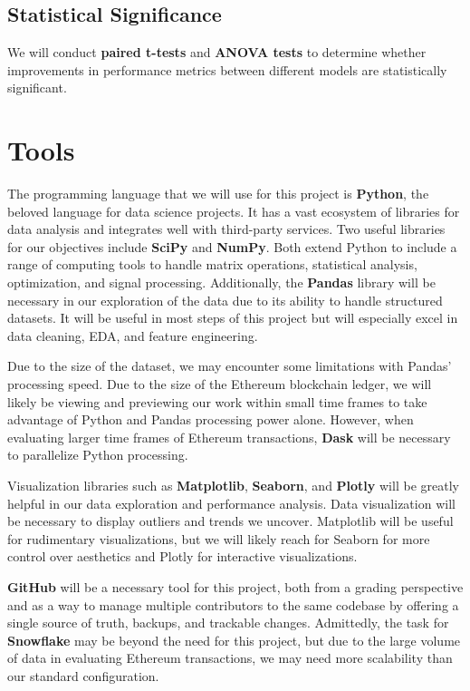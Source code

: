 \documentclass[sigconf]{acmart}
\begin{document}
\subsection{Statistical Significance}
We will conduct \textbf{paired t-tests} and \textbf{ANOVA tests} to determine whether improvements in performance metrics between different models are statistically significant.

\section{Tools}

The programming language that we will use for this project is \textbf{Python}, the beloved language for data science projects. It has a vast ecosystem of libraries for data analysis and integrates well with third-party services. Two useful libraries for our objectives include \textbf{SciPy} and \textbf{NumPy}. Both extend Python to include a range of computing tools to handle matrix operations, statistical analysis, optimization, and signal processing. Additionally, the \textbf{Pandas} library will be necessary in our exploration of the data due to its ability to handle structured datasets. It will be useful in most steps of this project but will especially excel in data cleaning, EDA, and feature engineering.

Due to the size of the dataset, we may encounter some limitations with Pandas’ processing speed. Due to the size of the Ethereum blockchain ledger, we will likely be viewing and previewing our work within small time frames to take advantage of Python and Pandas processing power alone. However, when evaluating larger time frames of Ethereum transactions, \textbf{Dask} will be necessary to parallelize Python processing.

Visualization libraries such as \textbf{Matplotlib}, \textbf{Seaborn}, and \textbf{Plotly} will be greatly helpful in our data exploration and performance analysis. Data visualization will be necessary to display outliers and trends we uncover. Matplotlib will be useful for rudimentary visualizations, but we will likely reach for Seaborn for more control over aesthetics and Plotly for interactive visualizations.

\textbf{GitHub} will be a necessary tool for this project, both from a grading perspective and as a way to manage multiple contributors to the same codebase by offering a single source of truth, backups, and trackable changes. Admittedly, the task for \textbf{Snowflake} may be beyond the need for this project, but due to the large volume of data in evaluating Ethereum transactions, we may need more scalability than our standard configuration.
\end{document}
